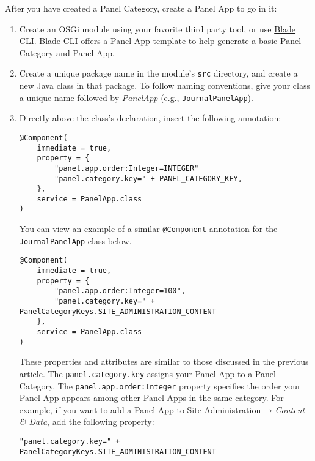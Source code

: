 After you have created a Panel Category, create a Panel App to go in it:

\begin{enumerate}
\def\labelenumi{\arabic{enumi}.}
\item
  Create an OSGi module using your favorite third party tool, or use
  \href{/docs/7-2/reference/-/knowledge_base/r/blade-cli}{Blade CLI}.
  Blade CLI offers a
  \href{/docs/7-2/reference/-/knowledge_base/r/panel-app-template}{Panel
  App} template to help generate a basic Panel Category and Panel App.
\item
  Create a unique package name in the module's \texttt{src} directory,
  and create a new Java class in that package. To follow naming
  conventions, give your class a unique name followed by \emph{PanelApp}
  (e.g., \texttt{JournalPanelApp}).
\item
  Directly above the class's declaration, insert the following
  annotation:

\begin{verbatim}
@Component(
    immediate = true,
    property = {
        "panel.app.order:Integer=INTEGER"
        "panel.category.key=" + PANEL_CATEGORY_KEY,
    },
    service = PanelApp.class
)
\end{verbatim}

  You can view an example of a similar \texttt{@Component} annotation
  for the \texttt{JournalPanelApp} class below.

\begin{verbatim}
@Component(
    immediate = true,
    property = {
        "panel.app.order:Integer=100",
        "panel.category.key=" + PanelCategoryKeys.SITE_ADMINISTRATION_CONTENT
    },
    service = PanelApp.class
)
\end{verbatim}

  These properties and attributes are similar to those discussed in the
  previous
  \href{/docs/7-2/customization/-/knowledge_base/c/adding-custom-panel-categories}{article}.
  The \texttt{panel.category.key} assigns your Panel App to a Panel
  Category. The \texttt{panel.app.order:Integer} property specifies the
  order your Panel App appears among other Panel Apps in the same
  category. For example, if you want to add a Panel App to Site
  Administration → \emph{Content \& Data}, add the following property:

\begin{verbatim}
"panel.category.key=" + PanelCategoryKeys.SITE_ADMINISTRATION_CONTENT
\end{verbatim}


\end{enumerate}
